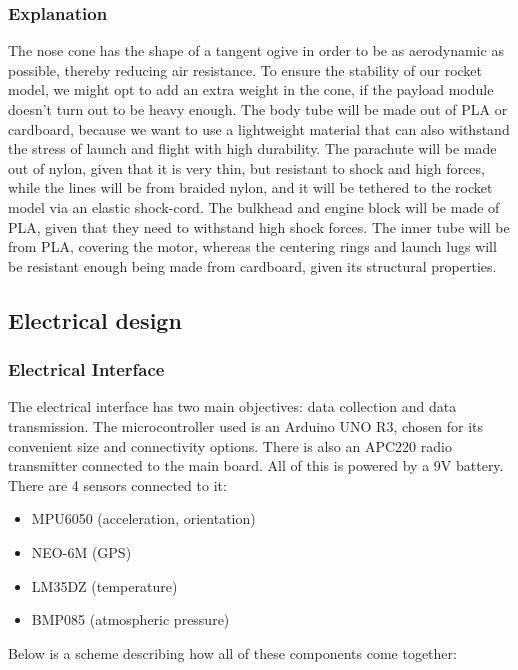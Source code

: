 \subsubsection{Explanation}

The nose cone has the shape of a tangent ogive in order to be as aerodynamic as possible, thereby reducing air resistance. To ensure the stability of our rocket model, we might opt to add an extra weight in the cone, if the payload module doesn’t turn out to be heavy enough. The body tube will be made out of PLA or cardboard, because we want to use a lightweight material that can also withstand the stress of launch and flight with high durability. The parachute will be made out of nylon, given that it is very thin, but resistant to shock and high forces, while the lines will be from braided nylon, and it will be tethered to the rocket model via an elastic shock-cord. The bulkhead and engine block will be made of PLA, given that they need to withstand high shock forces. The inner tube will be from PLA, covering the motor, whereas the centering rings and launch lugs will be resistant enough being made from cardboard, given its structural properties.

\subsection{Electrical design}

\subsubsection{Electrical Interface}

The electrical interface has two main objectives: data collection and data transmission. The microcontroller used is an Arduino UNO R3, chosen for its convenient size and connectivity options. There is also an APC220 radio transmitter connected to the main board. All of this is powered by a 9V battery. There are 4 sensors connected to it:

\begin{itemize}
    \item MPU6050 (acceleration, orientation)
    \item NEO-6M (GPS)
    \item LM35DZ (temperature)
    \item BMP085 (atmospheric pressure)
\end{itemize}

Below is a scheme describing how all of these components come together:

